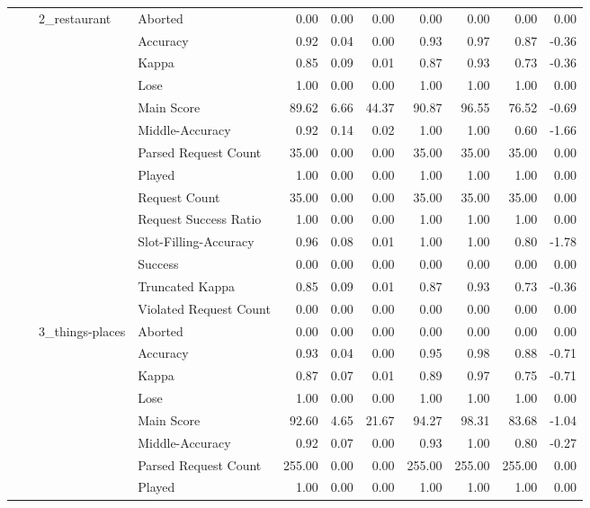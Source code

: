 \begin{tabular}{llllrrrrrrr}
\cline{3-11}
 &  & \multirow[t]{14}{*}{2_restaurant} & Aborted & 0.00 & 0.00 & 0.00 & 0.00 & 0.00 & 0.00 & 0.00 \\
 &  &  & Accuracy & 0.92 & 0.04 & 0.00 & 0.93 & 0.97 & 0.87 & -0.36 \\
 &  &  & Kappa & 0.85 & 0.09 & 0.01 & 0.87 & 0.93 & 0.73 & -0.36 \\
 &  &  & Lose & 1.00 & 0.00 & 0.00 & 1.00 & 1.00 & 1.00 & 0.00 \\
 &  &  & Main Score & 89.62 & 6.66 & 44.37 & 90.87 & 96.55 & 76.52 & -0.69 \\
 &  &  & Middle-Accuracy & 0.92 & 0.14 & 0.02 & 1.00 & 1.00 & 0.60 & -1.66 \\
 &  &  & Parsed Request Count & 35.00 & 0.00 & 0.00 & 35.00 & 35.00 & 35.00 & 0.00 \\
 &  &  & Played & 1.00 & 0.00 & 0.00 & 1.00 & 1.00 & 1.00 & 0.00 \\
 &  &  & Request Count & 35.00 & 0.00 & 0.00 & 35.00 & 35.00 & 35.00 & 0.00 \\
 &  &  & Request Success Ratio & 1.00 & 0.00 & 0.00 & 1.00 & 1.00 & 1.00 & 0.00 \\
 &  &  & Slot-Filling-Accuracy & 0.96 & 0.08 & 0.01 & 1.00 & 1.00 & 0.80 & -1.78 \\
 &  &  & Success & 0.00 & 0.00 & 0.00 & 0.00 & 0.00 & 0.00 & 0.00 \\
 &  &  & Truncated Kappa & 0.85 & 0.09 & 0.01 & 0.87 & 0.93 & 0.73 & -0.36 \\
 &  &  & Violated Request Count & 0.00 & 0.00 & 0.00 & 0.00 & 0.00 & 0.00 & 0.00 \\
\cline{3-11}
 &  & \multirow[t]{14}{*}{3_things-places} & Aborted & 0.00 & 0.00 & 0.00 & 0.00 & 0.00 & 0.00 & 0.00 \\
 &  &  & Accuracy & 0.93 & 0.04 & 0.00 & 0.95 & 0.98 & 0.88 & -0.71 \\
 &  &  & Kappa & 0.87 & 0.07 & 0.01 & 0.89 & 0.97 & 0.75 & -0.71 \\
 &  &  & Lose & 1.00 & 0.00 & 0.00 & 1.00 & 1.00 & 1.00 & 0.00 \\
 &  &  & Main Score & 92.60 & 4.65 & 21.67 & 94.27 & 98.31 & 83.68 & -1.04 \\
 &  &  & Middle-Accuracy & 0.92 & 0.07 & 0.00 & 0.93 & 1.00 & 0.80 & -0.27 \\
 &  &  & Parsed Request Count & 255.00 & 0.00 & 0.00 & 255.00 & 255.00 & 255.00 & 0.00 \\
 &  &  & Played & 1.00 & 0.00 & 0.00 & 1.00 & 1.00 & 1.00 & 0.00 \\

\end{tabular}

